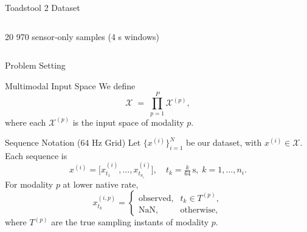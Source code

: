 \begin{frame}{Toadstool 2 Dataset}
\begin{columns}[T]
\begin{column}{0.5\textwidth}
		\begin{block}{}
			20 970 sensor‐only samples (4 s windows)
		\end{block}

		\end{column}
		
	\end{columns}
\end{frame}


\begin{frame}[t]{Problem Setting}
	\begin{block}{Multimodal Input Space}
		We define 
		\[
		\mathcal{X} \;=\;\prod_{p=1}^{P}\mathcal{X}^{(p)},
		\]
		where each $\mathcal{X}^{(p)}$ is the input space of modality $p$.
	\end{block}
	\vspace{-0.5em}
	\begin{block}{Sequence Notation (64 Hz Grid)}
		Let $\{x^{(i)}\}_{i=1}^{N}$ be our dataset, with $x^{(i)}\in\mathcal{X}$.  Each sequence is
		\[
		x^{(i)}
		=\bigl[x^{(i)}_{t_{1}},\dots,x^{(i)}_{t_{n_i}}\bigr],
		\quad t_k = \tfrac{k}{64}\,\mathrm{s},\;k=1,\dots,n_i.
		\]
		For modality $p$ at lower native rate,
		\[
		x^{(i,p)}_{t_k} =
		\begin{cases}
			\text{observed}, & t_k\in T^{(p)},\\
			\mathrm{NaN},    & \text{otherwise},
		\end{cases}
		\]
		where $T^{(p)}$ are the true sampling instants of modality $p$.
	\end{block}
\end{frame}
